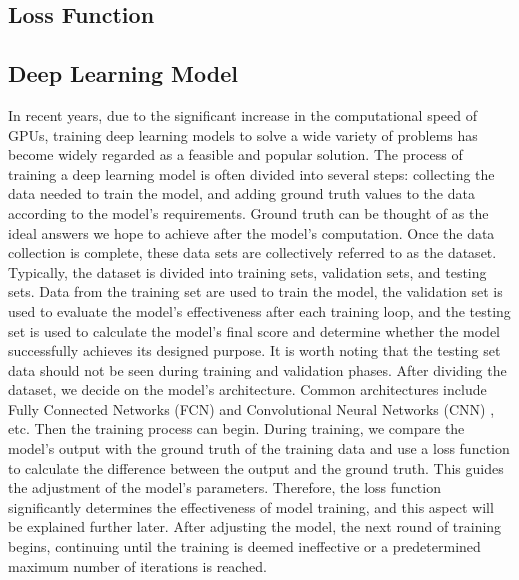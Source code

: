 \begin{ZhChapter}
    \section{Loss Function}

    \subsection{Deep Learning Model}
    In recent years, due to the significant increase in the computational speed of GPUs, training deep learning models to solve a wide variety of problems has become widely regarded as a feasible and popular solution. The process of training a deep learning model is often divided into several steps: collecting the data needed to train the model, and adding ground truth values to the data according to the model's requirements. Ground truth can be thought of as the ideal answers we hope to achieve after the model's computation. Once the data collection is complete, these data sets are collectively referred to as the dataset. Typically, the dataset is divided into training sets, validation sets, and testing sets. Data from the training set are used to train the model, the validation set is used to evaluate the model's effectiveness after each training loop, and the testing set is used to calculate the model's final score and determine whether the model successfully achieves its designed purpose. It is worth noting that the testing set data should not be seen during training and validation phases. After dividing the dataset, we decide on the model's architecture. Common architectures include Fully Connected Networks (FCN) \cite{iliadis2018deep} and Convolutional Neural Networks (CNN) \cite{wu2017introduction}, etc. Then the training process can begin. During training, we compare the model's output with the ground truth of the training data and use a loss function to calculate the difference between the output and the ground truth. This guides the adjustment of the model's parameters. Therefore, the loss function significantly determines the effectiveness of model training, and this aspect will be explained further later. After adjusting the model, the next round of training begins, continuing until the training is deemed ineffective or a predetermined maximum number of iterations is reached.

\end{ZhChapter}
